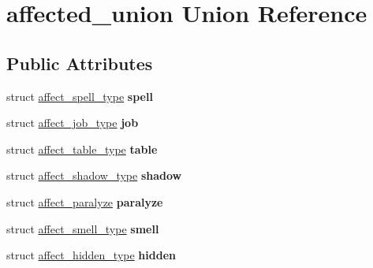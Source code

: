 \hypertarget{unionaffected__union}{\section{affected\-\_\-union Union Reference}
\label{unionaffected__union}
}
\subsection*{Public Attributes}
\begin{DoxyCompactItemize}
\item 
\hypertarget{unionaffected__union_abc69e41b5a0c0862865995786229f28c}{struct \hyperlink{structaffect__spell__type}{affect\-\_\-spell\-\_\-type} {\bfseries spell}}\label{unionaffected__union_abc69e41b5a0c0862865995786229f28c}

\item 
\hypertarget{unionaffected__union_a3fe2836525837d34ceeb03f2318020d4}{struct \hyperlink{structaffect__job__type}{affect\-\_\-job\-\_\-type} {\bfseries job}}\label{unionaffected__union_a3fe2836525837d34ceeb03f2318020d4}

\item 
\hypertarget{unionaffected__union_a2c380a11438c35d00530f5b4b1ad85b2}{struct \hyperlink{structaffect__table__type}{affect\-\_\-table\-\_\-type} {\bfseries table}}\label{unionaffected__union_a2c380a11438c35d00530f5b4b1ad85b2}

\item 
\hypertarget{unionaffected__union_a897dfa51b71113ca548535de1b524f41}{struct \hyperlink{structaffect__shadow__type}{affect\-\_\-shadow\-\_\-type} {\bfseries shadow}}\label{unionaffected__union_a897dfa51b71113ca548535de1b524f41}

\item 
\hypertarget{unionaffected__union_aead85b240b8970351cf54106b39cc4ce}{struct \hyperlink{structaffect__paralyze}{affect\-\_\-paralyze} {\bfseries paralyze}}\label{unionaffected__union_aead85b240b8970351cf54106b39cc4ce}

\item 
\hypertarget{unionaffected__union_ae141f4b53190ba959fbb62baa1ef8156}{struct \hyperlink{structaffect__smell__type}{affect\-\_\-smell\-\_\-type} {\bfseries smell}}\label{unionaffected__union_ae141f4b53190ba959fbb62baa1ef8156}

\item 
\hypertarget{unionaffected__union_ac60c7e40bd2558de2b035e6bda794571}{struct \hyperlink{structaffect__hidden__type}{affect\-\_\-hidden\-\_\-type} {\bfseries hidden}}\label{unionaffected__union_ac60c7e40bd2558de2b035e6bda794571}


\end{DoxyCompactItemize}
